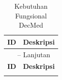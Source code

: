 \documentclass[bahasa, 12pt, a4paper, onecolumn, oneside, final]{report}
\begin{document}
\begin{longtable}{|p{0.8cm}|p{11.5cm}|}
	\caption{Kebutuhan Fungsional DecMed \autocite{sadewa2025decmed}}
	\label{tab:kebutuhan-fungsional-decmed}                                                                                                                      \\
	\hline
	\textbf{ID} & \textbf{Deskripsi}                                                                                                                             \\
	\hline
	\endfirsthead

	\multicolumn{2}{c}{\tablename\ \thetable{} -- Lanjutan}                                                                                                      \\
	\hline
	\textbf{ID} & \textbf{Deskripsi}                                                                                                                             \\
	\hline
	\endhead

	\hline
	\endfoot


\end{longtable}
\end{document}
